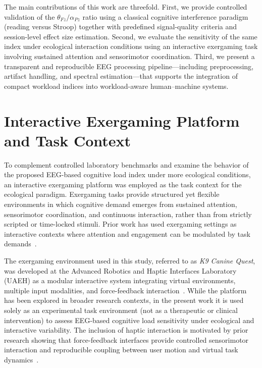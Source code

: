 \documentclass[10pt]{iopart}
\begin{document}
The main contributions of this work are threefold. First, we provide controlled validation of the $\theta_{Fz}/\alpha_{Pz}$ ratio using a classical cognitive interference paradigm (reading versus Stroop) together with predefined signal-quality criteria and session-level effect size estimation. Second, we evaluate the sensitivity of the same index under ecological interaction conditions using an interactive exergaming task involving sustained attention and sensorimotor coordination. Third, we present a transparent and reproducible EEG processing pipeline—including preprocessing, artifact handling, and spectral estimation—that supports the integration of compact workload indices into workload-aware human--machine systems.


\section{Interactive Exergaming Platform and Task Context}

To complement controlled laboratory benchmarks and examine the behavior of the proposed EEG-based cognitive load index under more ecological conditions, an interactive exergaming platform was employed as the task context for the ecological paradigm. Exergaming tasks provide structured yet flexible environments in which cognitive demand emerges from sustained attention, sensorimotor coordination, and continuous interaction, rather than from strictly scripted or time-locked stimuli. Prior work has used exergaming settings as interactive contexts where attention and engagement can be modulated by task demands~\cite{14,15}.

The exergaming environment used in this study, referred to as \emph{K9 Canine Quest}, was developed at the Advanced Robotics and Haptic Interfaces Laboratory (UAEH) as a modular interactive system integrating virtual environments, multiple input modalities, and force-feedback interaction~\cite{16}. While the platform has been explored in broader research contexts, in the present work it is used solely as an experimental task environment (not as a therapeutic or clinical intervention) to assess EEG-based cognitive load sensitivity under ecological and interactive variability. The inclusion of haptic interaction is motivated by prior research showing that force-feedback interfaces provide controlled sensorimotor interaction and reproducible coupling between user motion and virtual task dynamics~\cite{22,23}.
\end{document}
